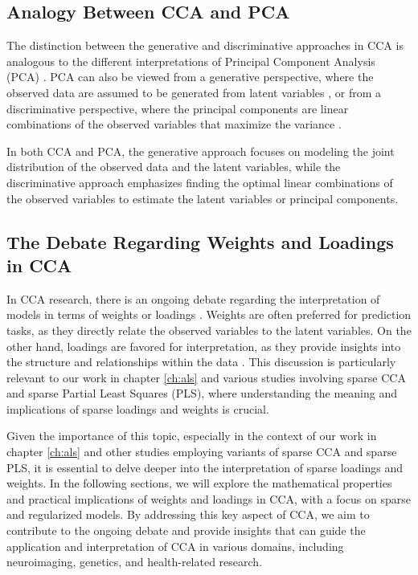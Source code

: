 \subsection{Analogy Between CCA and PCA}

The distinction between the generative and discriminative approaches in CCA is analogous to the different interpretations of Principal Component Analysis (PCA) \citep{park2023critical}. PCA can also be viewed from a generative perspective, where the observed data are assumed to be generated from latent variables \citep{tipping1999probabilistic}, or from a discriminative perspective, where the principal components are linear combinations of the observed variables that maximize the variance \citep{hotelling1933analysis}.

In both CCA and PCA, the generative approach focuses on modeling the joint distribution of the observed data and the latent variables, while the discriminative approach emphasizes finding the optimal linear combinations of the observed variables to estimate the latent variables or principal components.

\subsection{The Debate Regarding Weights and Loadings in CCA}

In CCA research, there is an ongoing debate regarding the interpretation of models in terms of weights or loadings \citep{gu2018simultaneous}. Weights are often preferred for prediction tasks, as they directly relate the observed variables to the latent variables. On the other hand, loadings are favored for interpretation, as they provide insights into the structure and relationships within the data \citep{liu2022improved}. This discussion is particularly relevant to our work in chapter \ref{ch:als} and various studies involving sparse CCA and sparse Partial Least Squares (PLS), where understanding the meaning and implications of sparse loadings and weights is crucial.

Given the importance of this topic, especially in the context of our work in chapter \ref{ch:als} and other studies employing variants of sparse CCA and sparse PLS, it is essential to delve deeper into the interpretation of sparse loadings and weights. In the following sections, we will explore the mathematical properties and practical implications of weights and loadings in CCA, with a focus on sparse and regularized models. By addressing this key aspect of CCA, we aim to contribute to the ongoing debate and provide insights that can guide the application and interpretation of CCA in various domains, including neuroimaging, genetics, and health-related research.

